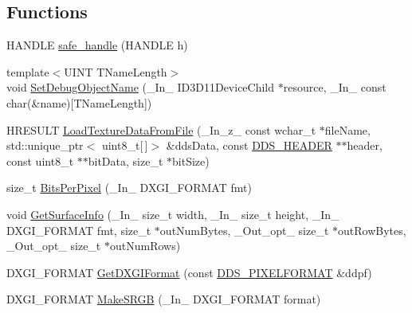 \subsection*{Functions}
\begin{DoxyCompactItemize}
\item 
H\+A\+N\+D\+LE \mbox{\hyperlink{namespaceanonymous__namespace_02dds__loader_8cpp_03_a42a5315606dc1a16b86ec2d8c69f91cc}{safe\+\_\+handle}} (H\+A\+N\+D\+LE h)
\item 
{\footnotesize template$<$U\+I\+NT T\+Name\+Length$>$ }\\void \mbox{\hyperlink{namespaceanonymous__namespace_02dds__loader_8cpp_03_ae2c59d976fe7df4fbb8b2fea912b9917}{Set\+Debug\+Object\+Name}} (\+\_\+\+In\+\_\+ I\+D3\+D11\+Device\+Child $\ast$resource, \+\_\+\+In\+\_\+ const char(\&name)\mbox{[}T\+Name\+Length\mbox{]})
\item 
H\+R\+E\+S\+U\+LT \mbox{\hyperlink{namespaceanonymous__namespace_02dds__loader_8cpp_03_ac6c472ab15d9e7bc7ff614a71cda8935}{Load\+Texture\+Data\+From\+File}} (\+\_\+\+In\+\_\+z\+\_\+ const wchar\+\_\+t $\ast$file\+Name, std\+::unique\+\_\+ptr$<$ uint8\+\_\+t\mbox{[}$\,$\mbox{]}$>$ \&dds\+Data, const \mbox{\hyperlink{struct_d_d_s___h_e_a_d_e_r}{D\+D\+S\+\_\+\+H\+E\+A\+D\+ER}} $\ast$$\ast$header, const uint8\+\_\+t $\ast$$\ast$bit\+Data, size\+\_\+t $\ast$bit\+Size)
\item 
size\+\_\+t \mbox{\hyperlink{namespaceanonymous__namespace_02dds__loader_8cpp_03_a2d6a6e62ba91c25b8451e886ce17615b}{Bits\+Per\+Pixel}} (\+\_\+\+In\+\_\+ D\+X\+G\+I\+\_\+\+F\+O\+R\+M\+AT fmt)
\item 
void \mbox{\hyperlink{namespaceanonymous__namespace_02dds__loader_8cpp_03_a25449cc397abdf01b3efe5533d205dd3}{Get\+Surface\+Info}} (\+\_\+\+In\+\_\+ size\+\_\+t width, \+\_\+\+In\+\_\+ size\+\_\+t height, \+\_\+\+In\+\_\+ D\+X\+G\+I\+\_\+\+F\+O\+R\+M\+AT fmt, size\+\_\+t $\ast$out\+Num\+Bytes, \+\_\+\+Out\+\_\+opt\+\_\+ size\+\_\+t $\ast$out\+Row\+Bytes, \+\_\+\+Out\+\_\+opt\+\_\+ size\+\_\+t $\ast$out\+Num\+Rows)
\item 
D\+X\+G\+I\+\_\+\+F\+O\+R\+M\+AT \mbox{\hyperlink{namespaceanonymous__namespace_02dds__loader_8cpp_03_a988e8e029084f26e2e287fe4846c1655}{Get\+D\+X\+G\+I\+Format}} (const \mbox{\hyperlink{struct_d_d_s___p_i_x_e_l_f_o_r_m_a_t}{D\+D\+S\+\_\+\+P\+I\+X\+E\+L\+F\+O\+R\+M\+AT}} \&ddpf)
\item 
D\+X\+G\+I\+\_\+\+F\+O\+R\+M\+AT \mbox{\hyperlink{namespaceanonymous__namespace_02dds__loader_8cpp_03_ab965569602893613caf7611315cbf534}{Make\+S\+R\+GB}} (\+\_\+\+In\+\_\+ D\+X\+G\+I\+\_\+\+F\+O\+R\+M\+AT format)

\end{DoxyCompactItemize}
